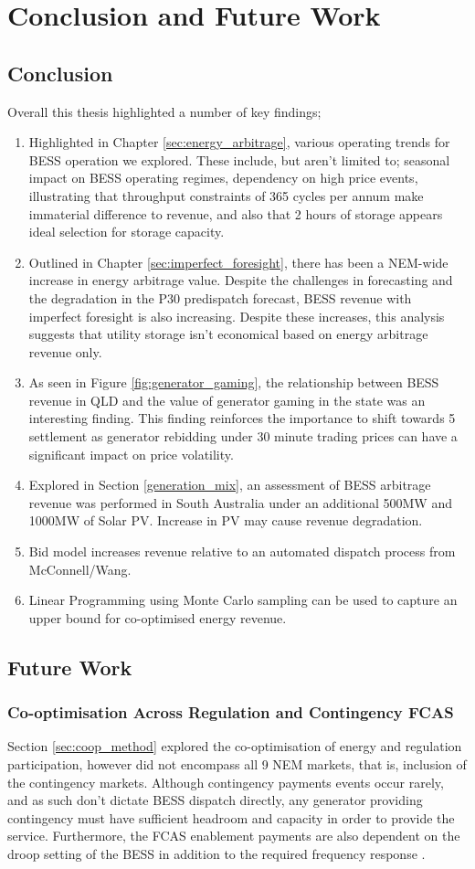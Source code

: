 \chapter{Conclusion and Future Work}
\section{Conclusion}
Overall this thesis highlighted a number of key findings;
\begin{enumerate}
    \item Highlighted in Chapter \ref{sec:energy_arbitrage}, various operating trends for BESS operation we explored. These include, but aren't limited to; seasonal impact on BESS operating regimes, dependency on high price events, illustrating that throughput constraints of 365 cycles per annum make immaterial difference to revenue, and also that 2 hours of storage appears ideal selection for storage capacity. 
    \item Outlined in Chapter \ref{sec:imperfect_foresight}, there has been a NEM-wide increase in energy arbitrage value. Despite the challenges in forecasting and the degradation in the P30 predispatch forecast, BESS revenue with imperfect foresight is also increasing. Despite these increases, this analysis suggests that utility storage isn't economical based on energy arbitrage revenue only.
    \item As seen in Figure \ref{fig:generator_gaming}, the relationship between BESS revenue in QLD and the value of generator gaming in the state was an interesting finding. This finding reinforces the importance to shift towards 5 settlement as generator rebidding under 30 minute trading prices can have a significant impact on price volatility. 
    \item Explored in Section \ref{generation_mix}, an assessment of BESS arbitrage revenue was performed in South Australia under an additional 500MW and 1000MW of Solar PV. 
    Increase in PV may cause revenue degradation.
    \item 
    Bid model increases revenue relative to an automated dispatch process from McConnell/Wang.
    \item Linear Programming using Monte Carlo sampling can be used to capture an upper bound for co-optimised energy revenue.  
\end{enumerate}
\section{Future Work}
\subsection{Co-optimisation Across Regulation and Contingency FCAS}
Section \ref{sec:coop_method} explored the co-optimisation of energy and regulation participation, however did not encompass all 9 NEM markets, that is, inclusion of the contingency markets. Although contingency payments events occur rarely, and as such don't dictate BESS dispatch directly, any generator providing contingency must have sufficient headroom and capacity in order to provide the service. Furthermore, the FCAS enablement payments are also dependent on the droop setting of the BESS in addition to the required frequency response \parencite{AEMO_Droop}.
